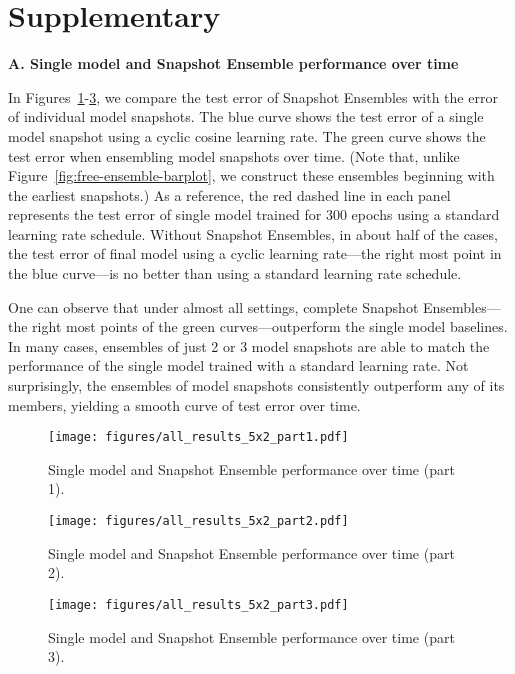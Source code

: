 
\section*{Supplementary}
\textbf{A. Single model and Snapshot Ensemble performance over time}

In Figures~\ref{fig:all-resuls-part1}-\ref{fig:all-resuls-part3}, we compare the test error of Snapshot Ensembles with the error of individual model snapshots. The blue curve shows the test error of a single model snapshot using a cyclic cosine learning rate. The green curve shows the test error when ensembling model snapshots over time. (Note that, unlike Figure~\ref{fig:free-ensemble-barplot}, we construct these ensembles beginning with the earliest snapshots.) As a reference, the red dashed line in each panel represents the test error of single model trained for 300 epochs using a standard learning rate schedule. Without Snapshot Ensembles, in about half of the cases, the test error of final model using a cyclic learning rate---the right most point in the blue curve---is no better than using a standard learning rate schedule.

One can observe that under almost all settings, complete Snapshot Ensembles---the right most points of the green curves---outperform the single model baselines. In many cases, ensembles of just 2 or 3 model snapshots are able to match the performance of the single model trained with a standard learning rate. Not surprisingly, the ensembles of model snapshots consistently outperform any of its members, yielding a smooth curve of test error over time.

\begin{figure}[!h]
    \texttt{[image: figures/all\_results\_5x2\_part1.pdf]}
    \caption{\small Single model and Snapshot Ensemble performance over time (part 1).}
    \label{fig:all-resuls-part1}
\end{figure}

\begin{figure}
    \texttt{[image: figures/all\_results\_5x2\_part2.pdf]}
    \caption{\small Single model and Snapshot Ensemble performance over time (part 2).}
    \label{fig:all-resuls-part2}
\end{figure}

\begin{figure}
    \texttt{[image: figures/all\_results\_5x2\_part3.pdf]}
    \caption{\small Single model and Snapshot Ensemble performance over time (part 3).}
    \label{fig:all-resuls-part3}
\end{figure}

